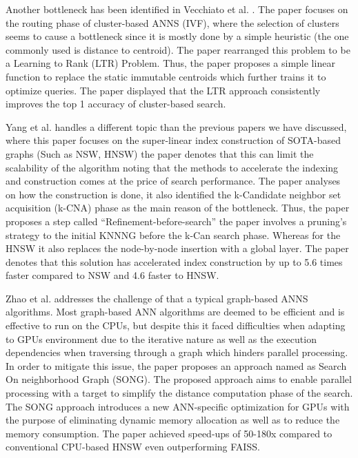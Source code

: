 \documentclass[conference]{IEEEtran}
\begin{document}
Another bottleneck has been identified in Vecchiato et al. \cite{vecchiato2024}. The paper focuses on the routing phase of cluster-based ANNS (IVF), where the selection of clusters seems to cause a bottleneck since it is mostly done by a simple heuristic (the one commonly used is distance to centroid). The paper rearranged this problem to be a Learning to Rank (LTR) Problem. Thus, the paper proposes a simple linear function to replace the static immutable centroids which further trains it to optimize queries. The paper displayed that the LTR approach consistently improves the top 1 accuracy of cluster-based search.

Yang et al. \cite{yang2025} handles a different topic than the previous papers we have discussed, where this paper focuses on the super-linear index construction of SOTA-based graphs (Such as NSW, HNSW) the paper denotes that this can limit the scalability of the algorithm noting that the methods to accelerate the indexing and construction comes at the price of search performance. The paper analyses on how the construction is done, it also identified the k-Candidate neighbor set acquisition (k-CNA) phase as the main reason of the bottleneck. Thus, the paper proposes a step called ``Refinement-before-search'' the paper involves a pruning's strategy to the initial KNNNG before the k-Can search phase. Whereas for the HNSW it also replaces the node-by-node insertion with a global layer. The paper denotes that this solution has accelerated index construction by up to 5.6 times faster compared to NSW and 4.6 faster to HNSW.

Zhao et al. \cite{zhao2020} addresses the challenge of that a typical graph-based ANNS algorithms. Most graph-based ANN algorithms are deemed to be efficient and is effective to run on the CPUs, but despite this it faced difficulties when adapting to GPUs environment due to the iterative nature as well as the execution dependencies when traversing through a graph which hinders parallel processing. In order to mitigate this issue, the paper proposes an approach named as Search On neighborhood Graph (SONG). The proposed approach aims to enable parallel processing with a target to simplify the distance computation phase of the search. The SONG approach introduces a new ANN-specific optimization for GPUs with the purpose of eliminating dynamic memory allocation as well as to reduce the memory consumption. The paper achieved speed-ups of 50-180x compared to conventional CPU-based HNSW even outperforming FAISS.
\end{document}
